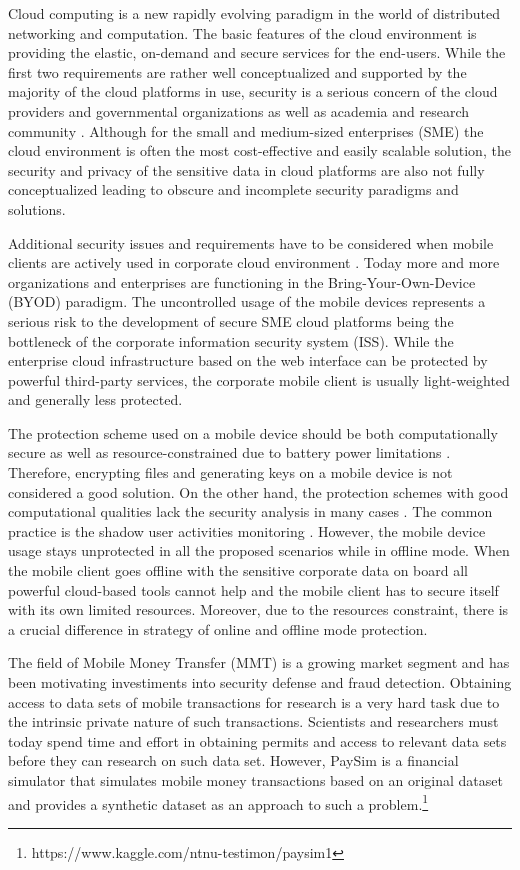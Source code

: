 Cloud computing is a new rapidly evolving paradigm in the world of distributed networking and computation. The basic features of the cloud environment is providing the elastic, on-demand and secure services for the end-users. While the first two requirements are rather well conceptualized and supported by the majority of the cloud platforms in use, security is a serious concern of the cloud providers and governmental organizations as well as academia and research community \cite{csa2016,higashi2015,gartner2015}. Although for the small and medium-sized enterprises (SME) the cloud environment is often the most cost-effective and easily scalable solution, the security and privacy of the sensitive data in cloud platforms are also not fully conceptualized leading to obscure and incomplete security paradigms and solutions.

Additional security issues and requirements have to be considered when mobile clients are actively used in corporate cloud environment \cite{yovel2014}. Today more and more organizations and enterprises are functioning in the Bring-Your-Own-Device (BYOD) paradigm. The uncontrolled usage of the mobile devices represents a serious risk to the development of secure SME cloud platforms being the bottleneck of the corporate information security system (ISS). While the enterprise cloud infrastructure based on the web interface can be protected by powerful third-party services, the corporate mobile client is usually light-weighted and generally less protected. 

The protection scheme used on a mobile device should be both computationally secure as well as resource-constrained due to battery power limitations \cite{khan2015cloud}. Therefore, encrypting files and generating keys on a mobile device is not considered a good solution. On the other hand, the protection schemes with good computational qualities lack the security analysis in many cases \cite{khan2014bss}. The common practice is the shadow user activities monitoring \cite{yovel2014}. However, the mobile device usage stays unprotected in all the proposed scenarios while in offline mode. When the mobile client goes offline with the sensitive corporate data on board all powerful cloud-based tools cannot help and the mobile client has to secure itself with its own limited resources. Moreover, due to the resources constraint, there is a crucial difference in strategy of online and offline mode protection.

The field of Mobile Money Transfer (MMT) is a growing market segment and has been motivating investiments into security defense and fraud detection. Obtaining access to data sets of mobile transactions for research is a very hard task due to the intrinsic private nature of such transactions. Scientists and researchers must today spend time and effort in obtaining permits and access to relevant data sets before they can research on such data set. However, PaySim is a financial simulator that simulates mobile money transactions based on an original dataset and provides a synthetic dataset as an approach to such a problem.\footnote{https://www.kaggle.com/ntnu-testimon/paysim1}

